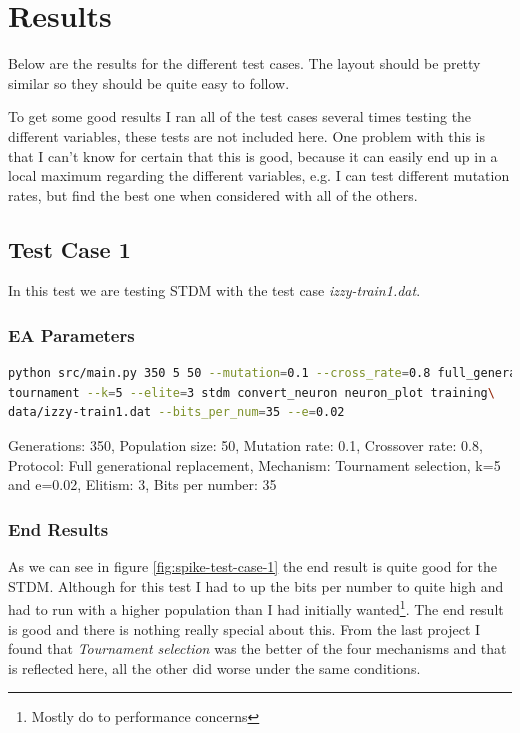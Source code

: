 \section{Results}\label{sec:results}
Below are the results for the different test cases. The layout should be pretty
similar so they should be quite easy to follow.

To get some good results I ran all of the test cases several times testing the
different variables, these tests are not included here. One problem with this is
that I can't know for certain that this is good, because it can easily end up in
a local maximum regarding the different variables, e.g. I can test different
mutation rates, but find the best one when considered with all of the others.

\subsection{Test Case 1}\label{sec:test-case-1}
In this test we are testing STDM with the test case
\textit{izzy-train1.dat}.
\subsubsection{EA Parameters}\label{sec:test-case-1-parameters}
\begin{lstlisting}[frame=single, language=bash, caption=Command-line to
replicate the results]
python src/main.py 350 5 50 --mutation=0.1 --cross_rate=0.8 full_generational
tournament --k=5 --elite=3 stdm convert_neuron neuron_plot training\
data/izzy-train1.dat --bits_per_num=35 --e=0.02
\end{lstlisting}
Generations: 350, Population size: 50, Mutation rate: 0.1, Crossover rate: 0.8, Protocol: Full generational replacement, Mechanism: Tournament selection, k=5 and e=0.02, Elitism: 3, Bits per number: 35
\subsubsection{End Results}\label{sec:test-case-1-results}
As we can see in figure \ref{fig:spike-test-case-1} the end result is quite good
for the STDM. Although for this test I had to up the bits per number to quite
high and had to run with a higher population than I had initially
wanted\footnote{Mostly do to performance concerns}. The end result is good and
there is nothing really special about this. From the last project I found that
\textit{Tournament selection} was the better of the four mechanisms and that is
reflected here, all the other did worse under the same conditions.

